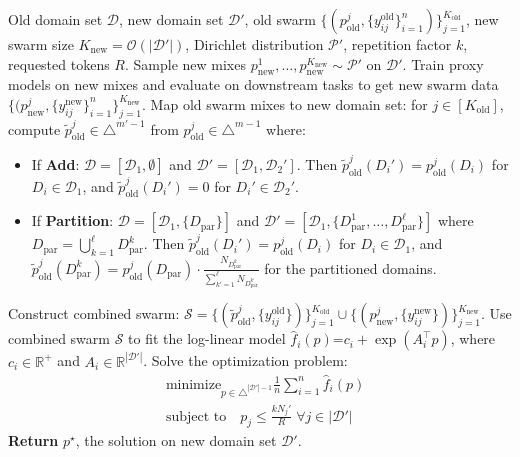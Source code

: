 \documentclass[table]{ai2style/ai2}
\newcommand{\D}[0]{\mathcal{D}}
\newcommand{\R}[0]{\mathbb{R}}
\begin{document}
\begin{algorithm}[htb]
   \caption{Swarm Reuse Mixing}
   \label{alg:swarm_reuse_method}
\begin{algorithmic}[1]
    \textcolor{olmoBlue}{Old domain set $\D$, new domain set $\D'$, old swarm $\{(p^j_{\text{old}}, \{y_{ij}^{\text{old}}\}_{i=1}^n)\}_{j=1}^{K_{\text{old}}}$}, new swarm size $K_{\text{new}} = \mathcal{O}(|\D'|)$, Dirichlet distribution $\mathcal{P}'$, repetition factor $k$, requested tokens $R$.
   \STATE Sample new mixes $p^1_{\text{new}}, \dots, p^{K_{\text{new}}}_{\text{new}} \sim \mathcal{P}'$ on $\D'$.
   \STATE Train proxy models on new mixes and evaluate on downstream tasks to get new swarm data $\{(p^j_{\text{new}}, \{y_{ij}^{\text{new}}\}_{i = 1}^n \}_{j =1}^{K_{\text{new}}}$.
   \STATE \textcolor{olmoBlue}{Map old swarm mixes to new domain set: for $j \in [K_{\text{old}}]$, compute $\tilde{p}^j_{\text{old}} \in \triangle^{m'-1}$ from $p^j_{\text{old}} \in \triangle^{m-1}$ where:}
   \begin{itemize}
       \item \textcolor{olmoBlue}{If \textbf{Add}: $\D = [\D_1, \emptyset]$ and $\D' = [\D_1, \D_2']$. Then $\tilde{p}^j_{\text{old}}(D_i') = p^j_{\text{old}}(D_i)$ for $D_i \in \D_1$, and $\tilde{p}^j_{\text{old}}(D_i') = 0$ for $D_i' \in \D_2'$.}
       \item \textcolor{olmoBlue}{If \textbf{Partition}: $\D = [\D_1, \{D_{\text{par}}\}]$ and $\D' = [\D_1, \{D_{\text{par}}^1, \dots, D_{\text{par}}^{\ell}\}]$ where $D_{\text{par}} = \bigcup_{k=1}^{\ell} D_{\text{par}}^k$. Then $\tilde{p}^j_{\text{old}}(D_i') = p^j_{\text{old}}(D_i)$ for $D_i \in \D_1$, and $\tilde{p}^j_{\text{old}}(D_{\text{par}}^k) = p^j_{\text{old}}(D_{\text{par}}) \cdot \frac{N_{D_{\text{par}}^k}}{\sum_{k'=1}^{\ell} N_{D_{\text{par}}^{k'}}}$ for the partitioned domains.}
   \end{itemize}
   \STATE \textcolor{olmoBlue}{Construct combined swarm: $\mathcal{S} = \{(\tilde{p}^j_{\text{old}}, \{y_{ij}^{\text{old}}\})\}_{j=1}^{K_{\text{old}}} \cup \{(p^j_{\text{new}}, \{y_{ij}^{\text{new}}\})\}_{j=1}^{K_{\text{new}}}$}.
       \STATE Use combined swarm $\mathcal{S}$ to fit the log-linear model $\hat{f}_i(p) \texttt{=} c_i + \exp(A_i^\top p)$, where $c_i \in \R^+$ and $A_i \in \R^{|\D'|}$.
   \ENDFOR
   \STATE Solve the optimization problem:
   \begin{align}
       &\text{minimize}_{p \in \triangle^{|\D'|-1}} \frac{1}{n} \sum_{i=1}^n \hat{f}_i(p) \\ 
       &\text{subject to} \quad p_j \leq \frac{k N_j'}{R} \; \forall j \in |\D'| \nonumber
   \end{align}
   \STATE \textbf{Return} $p^\star$, the solution on new domain set $\D'$.
\end{algorithmic}
\end{algorithm}
\end{document}
